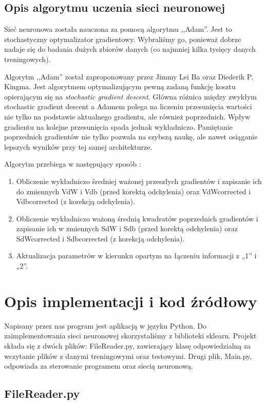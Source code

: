 \documentclass{classrep}
\begin{document}
\subsection{Opis algorytmu uczenia sieci neuronowej}
Sieć neuronowa została nauczona za pomocą algorytmu ,,Adam''. Jest to stochastyczny optymalizator gradientowy. Wybraliśmy go, ponieważ dobrze nadaje się do badania dużych zbiorów danych (co najmniej kilka tysięcy danych treningowych). \cite{doc} 

Algorytm ,,Adam'' został zaproponowany przez Jimmy Lei Ba oraz Diederik P. Kingma. Jest algorytmem optymalizującym pewną zadaną funkcję kosztu opierającym się na \textsl{stochastic gradient descent}. Główna różnica między zwykłym stochastic gradient descent a Adamem polega na liczeniu przesunięcia wartości nie tylko na podstawie aktualnego gradientu, ale również poprzednich.
Wpływ gradientu na kolejne przesunięcia spada jednak wykładniczo. Pamiętanie poprzednich gradientów nie tylko pozwala na szybszą naukę, ale nawet osiąganie lepszych wyników przy tej samej architekturze. \cite{adampl} 

Algorytm przebiega w następujący sposób \cite{adamdzialanie}:
\begin{enumerate}
	\item Obliczenie wykładniczo średniej ważonej przeszłych gradientów i zapisanie ich do zmiennych VdW i Vdb (przed korektą odchylenia) oraz VdWcorrected i Vdbcorrected (z korekcją odchylenia).
	\item Obliczenie wykładniczo ważoną średnią kwadratów poprzednich gradientów i zapisanie ich w zmiennych SdW i Sdb (przed korektą odchylenia) oraz SdWcorrected i Sdbcorrected (z korekcją odchylenia).
	\item Aktualizacja parametrów w kierunku opartym na łączeniu informacji z „1” i „2”.
\end{enumerate}

\section{Opis implementacji i kod źródłowy} 
Napisany przez nas program jest aplikacją w języku Python. Do zaimplementowania sieci neuronowej skorzystaliśmy z biblioteki sklearn. \cite{doc} Projekt składa się z dwóch plików: FileReader.py, zawierający klasę odpowiedzialną za wczytanie plików z danymi treningowymi oraz testowymi. Drugi plik, Main.py, odpowiada za sterowanie programem oraz siecią neuronową.

\subsection{FileReader.py}
\end{document}

